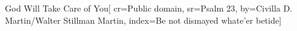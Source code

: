 {God Will Take Care of You}[
    cr={Public domain},
    sr={Psalm 23},
    by={Civilla D. Martin/Walter Stillman Martin},
    index={Be not dismayed whate'er betide}]
